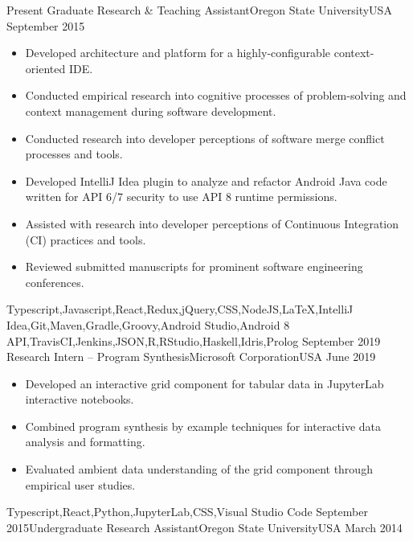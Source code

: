 \documentclass[localFont,alternative]{yaac-another-awesome-cv}
\begin{document}
\begin{experiences}
  \experience
    {Present}       {Graduate Research \& Teaching Assistant}{Oregon State University}{USA}
    {September 2015}{
                      \begin{itemize}
                        \item Developed architecture and platform for a highly-configurable context-oriented IDE.
                        \item Conducted empirical research into cognitive processes of problem-solving and context management during software development.
                        \item Conducted research into developer perceptions of software merge conflict processes and tools.
                        \item Developed IntelliJ Idea plugin to analyze and refactor Android Java code written for API 6/7 security to use API 8 runtime permissions.
                        \item Assisted with research into developer perceptions of Continuous Integration (CI) practices and tools. 
                        \item Reviewed submitted manuscripts for prominent software engineering conferences.                                        
                      \end{itemize}
                    }
    {Typescript,Javascript,React,Redux,jQuery,CSS,NodeJS,LaTeX,IntelliJ Idea,Git,Maven,Gradle,Groovy,Android Studio,Android 8 API,TravisCI,Jenkins,JSON,R,RStudio,Haskell,Idris,Prolog}
  \emptySeparator
  \experience
  {September 2019}  {Research Intern -- Program Synthesis}{Microsoft Corporation}{USA}
    {June 2019}{
      \begin{itemize}
        \item Developed an interactive grid component for tabular data in JupyterLab interactive notebooks.
        \item Combined program synthesis by example techniques for interactive data analysis and formatting.
        \item Evaluated ambient data understanding of the grid component through empirical user studies.
      \end{itemize}
    }{Typescript,React,Python,JupyterLab,CSS,Visual Studio Code}
  \emptySeparator
  \experience
    {September 2015}{Undergraduate Research Assistant}{Oregon State University}{USA}
    {March 2014}    {
                      \begin{itemize}

\end{itemize}}
\end{experiences}
\end{document}
